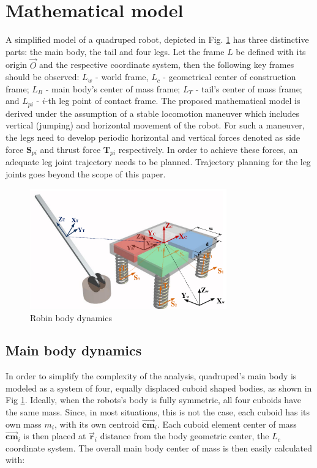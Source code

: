 \section{Mathematical model}\label{sec:MathModel}
A simplified model of a quadruped robot, depicted in Fig. \ref{fig:rmoment} has three distinctive parts: the main body, the tail and four legs. Let the frame $L$ be defined with its origin $\vec{O}$ and the respective coordinate system, then the following key frames should be observed: $L_w$ - world frame, $L_c$ - geometrical center of construction frame; $L_B$ - main body's center of mass frame; $L_T$ - tail's center of mass frame; and $L_{pi}$ - $i$-th leg point of contact frame. The proposed mathematical model is derived under the assumption of a stable locomotion maneuver which includes vertical (jumping) and horizontal movement of the robot. For such a maneuver, the legs need to develop periodic horizontal and vertical forces denoted as side force $\textbf{S}_{pi}$ and thrust force $\textbf{T}_{pi}$ respectively. In order to achieve these forces, an adequate leg joint trajectory needs to be planned. Trajectory planning for the leg joints goes beyond the scope of this paper. 

\begin{figure}
	\centering
	\includegraphics[width=85mm]{./pictures/RobinMoment.pdf}
	\caption{Robin body dynamics}
	\label{fig:rmoment}
\end{figure}

\subsection{Main body dynamics}
In order to simplify the complexity of the analysis, quadruped's main body is modeled as a system of four, equally displaced cuboid shaped bodies, as shown in Fig \ref{fig:rmoment}. Ideally, when the robots's body is fully symmetric, all four cuboids have the same mass. Since, in most situations, this is not the case, each cuboid has its own mass $m_i$, with its own centroid $\vec{\textbf{cm}}_i$. Each cuboid element center of mass $\vec{\textbf{cm}}_i$ is then placed at $\vec{\textbf{r}}_i$ distance from the body geometric center, the $L_c$ coordinate system. The overall main body center of mass is then easily calculated with:
 
